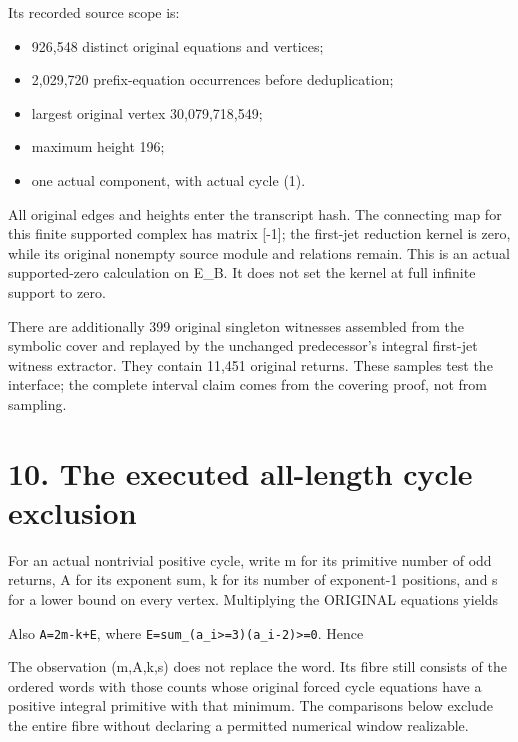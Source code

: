 Its recorded source scope is:

\begin{itemize}
\tightlist
\item
  926,548 distinct original equations and vertices;
\item
  2,029,720 prefix-equation occurrences before deduplication;
\item
  largest original vertex 30,079,718,549;
\item
  maximum height 196;
\item
  one actual component, with actual cycle (1).
\end{itemize}

All original edges and heights enter the transcript hash. The connecting
map for this finite supported complex has matrix {[}-1{]}; the first-jet
reduction kernel is zero, while its original nonempty source module and
relations remain. This is an actual supported-zero calculation on E\_B.
It does not set the kernel at full infinite support to zero.

There are additionally 399 original singleton witnesses assembled from
the symbolic cover and replayed by the unchanged predecessor's integral
first-jet witness extractor. They contain 11,451 original returns. These
samples test the interface; the complete interval claim comes from the
covering proof, not from sampling.

\section{10. The executed all-length cycle exclusion}

For an actual nontrivial positive cycle, write m for its primitive
number of odd returns, A for its exponent sum, k for its number of
exponent-1 positions, and s for a lower bound on every vertex.
Multiplying the ORIGINAL equations yields


Also \nolinkurl{A=2m-k+E}, where \nolinkurl{E=sum_(a_i>=3)(a_i-2)>=0}.
Hence


The observation (m,A,k,s) does not replace the word. Its fibre still
consists of the ordered words with those counts whose original forced
cycle equations have a positive integral primitive with that minimum.
The comparisons below exclude the entire fibre without declaring a
permitted numerical window realizable.

